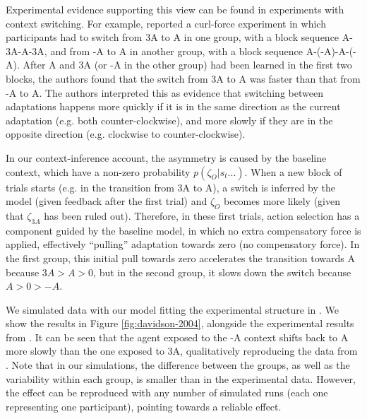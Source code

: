 \documentclass[a4paper,doc,floatsintext,natbib]{apa6}%
\def \fref #1{Figure \ref{#1}}     %
\begin{document}
Experimental evidence supporting this view can be found in experiments with context switching. For example, \cite{Davidson_Scaling_2004} reported a curl-force experiment in which participants had to switch from 3A to A in one group, with a block sequence A-3A-A-3A, and from -A to A in another group, with a block sequence A-(-A)-A-(-A). After A and 3A (or -A in the other group) had been learned in the first two blocks, the authors found that the switch from 3A to A was faster than that from -A to A. The authors interpreted this as evidence that switching between adaptations happens more quickly if it is in the same direction as the current adaptation (e.g. both counter-clockwise), and more slowly if they are in the opposite direction (e.g. clockwise to counter-clockwise).

In our context-inference account, the asymmetry is caused by the baseline context, which have a non-zero probability $p(\zeta_O | s_t ...)$. When a new block of trials starts (e.g. in the transition from 3A to A), a switch is inferred by the model (given feedback after the first trial) and $\zeta_O$ becomes more likely (given that $\zeta_{3A}$ has been ruled out). Therefore, in these first trials, action selection has a component guided by the baseline model, in which no extra compensatory force is applied, effectively ``pulling'' adaptation towards zero (no compensatory force). In the first group, this initial pull towards zero accelerates the transition towards A because $3A > A > 0$, but in the second group, it slows down the switch because $A > 0 > -A$.

We simulated data with our model fitting the experimental structure in \cite{Davidson_Scaling_2004}. We show the results in \fref{fig:davidson-2004}, alongside the experimental results from \cite{Davidson_Scaling_2004}. It can be seen that the agent exposed to the -A context shifts back to A more slowly than the one exposed to 3A, qualitatively reproducing the data from \cite{Davidson_Scaling_2004}. Note that in our simulations, the difference between the groups, as well as the variability within each group, is smaller than in the experimental data. However, the effect can be reproduced with any number of simulated runs (each one representing one participant), pointing towards a reliable effect.
\end{document}
